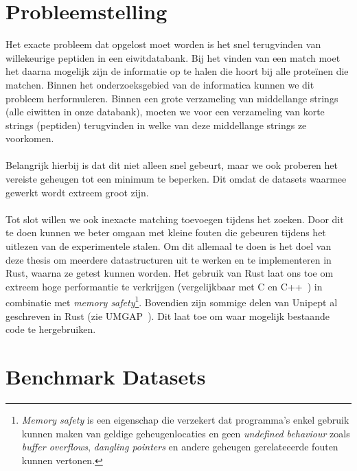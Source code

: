\documentclass[11pt,dutch,faculty=we,layout=titlefont,underline=false,titleUppercase=true,titleUnderline=true]{ugent2016-report}
\begin{document}
    \section{Probleemstelling}\label{sec:probleemstelling}
    Het exacte probleem dat opgelost moet worden is het snel terugvinden van willekeurige peptiden in een eiwitdatabank.
    Bij het vinden van een match moet het daarna mogelijk zijn de informatie op te halen die hoort bij alle proteïnen die matchen.
    Binnen het onderzoeksgebied van de informatica kunnen we dit probleem herformuleren.
    Binnen een grote verzameling van middellange strings (alle eiwitten in onze databank), moeten we voor een verzameling van korte strings (peptiden) terugvinden in welke van deze middellange strings ze voorkomen.
    \\ \\
    Belangrijk hierbij is dat dit niet alleen snel gebeurt, maar we ook proberen het vereiste geheugen tot een minimum te beperken.
    Dit omdat de datasets waarmee gewerkt wordt extreem groot zijn.
    \\ \\
    Tot slot willen we ook inexacte matching toevoegen tijdens het zoeken.
    Door dit te doen kunnen we beter omgaan met kleine fouten die gebeuren tijdens het uitlezen van de experimentele stalen.
    Om dit allemaal te doen is het doel van deze thesis om meerdere datastructuren uit te werken en te implementeren in Rust, waarna ze getest kunnen worden.
    Het gebruik van Rust laat ons toe om extreem hoge performantie te verkrijgen (vergelijkbaar met C en C++~\cite{rustPerformantie}) in combinatie met \textit{memory safety}\footnote{\textit{Memory safety} is een eigenschap die verzekert dat programma's enkel gebruik kunnen maken van geldige geheugenlocaties en geen \textit{undefined behaviour} zoals \textit{buffer overflows}, \textit{dangling pointers} en andere geheugen gerelateeerde fouten kunnen vertonen.}.
    Bovendien zijn sommige delen van Unipept al geschreven in Rust (zie UMGAP~\cite{UMGAP_paper, UMGAP_source}).
    Dit laat toe om waar mogelijk bestaande code te hergebruiken.


    \section{Benchmark Datasets}\label{sec:datasets}
\end{document}
